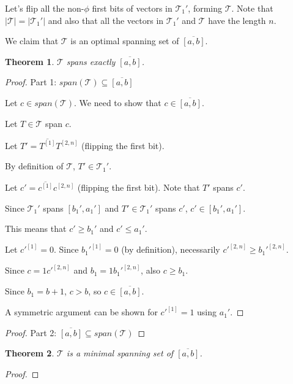 \documentclass{article}
\theoremstyle{plain}
\newtheorem{theorem}{Theorem}[subsection]
\theoremstyle{definition}
\newcommand{\interval}[2]{[#1, #2]}
\newcommand{\compl}[1]{\overline{#1}}
\newcommand{\finterval}[2]{\compl{\interval{#1}{#2}}}
\newcommand{\bit}[2]{#1^{[#2]}}
\newcommand{\bits}[3]{#1^{\interval{#2}{#3}}}
\begin{document}
Let's flip all the non-$\phi$ first bits
of vectors in $\mathcal{T}_1'$,
forming $\mathcal{T}$.
Note that $|\mathcal{T}| = |\mathcal{T}_1'|$
and also that all the vectors in $\mathcal{T}_1'$
and $\mathcal{T}$ have the length $n$.

We claim that $\mathcal{T}$ is an optimal spanning set
of $\finterval{a}{b}$.

\begin{theorem}
$\mathcal{T}$ spans exactly $\finterval{a}{b}$.
\end{theorem}

\begin{proof}
Part 1: $span(\mathcal{T}) \subseteq \finterval{a}{b}$

Let $c \in span(\mathcal{T})$.
We need to show that $c \in \finterval{a}{b}$.

Let $T \in \mathcal{T}$ span $c$.

Let $T' = \compl{\bit{T}{1}} \bits{T}{2}{n}$
(flipping the first bit).

By definition of $\mathcal{T}$,
$T' \in \mathcal{T}_1'$.

Let $c' = \compl{\bit{c}{1}} \bits{c}{2}{n}$
(flipping the first bit).
Note that $T'$ spans $c'$.

Since $\mathcal{T}_1'$ spans $\interval{b_1'}{a_1'}$
and $T' \in \mathcal{T}_1'$ spans $c'$,
$c' \in \interval{b_1'}{a_1'}$.

This means that $c' \geq b_1'$ and $c' \leq a_1'$.

Let $\bit{c'}{1} = 0$.
Since $\bit{b_1'}{1} = 0$ (by definition),
necessarily $\bits{c'}{2}{n} \geq \bits{b_1'}{2}{n}$.

Since $c = 1 \bits{c'}{2}{n}$
and $b_1 = 1 \bits{b_1'}{2}{n}$,
also $c \geq b_1$.

Since $b_1 = b + 1$,
$c > b$,
so $c \in \finterval{a}{b}$.

A symmetric argument can be shown for $\bit{c'}{1} = 1$
using $a_1'$.
\end{proof}

\begin{proof}
Part 2: $\finterval{a}{b} \subseteq span(\mathcal{T})$
\end{proof}

\begin{theorem}
$\mathcal{T}$ is a minimal spanning set of $\finterval{a}{b}$.
\end{theorem}

\begin{proof}
\end{proof}




\printglossaries
\end{document}
